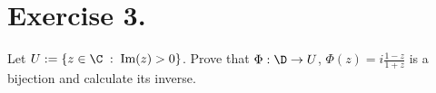 \section*{Exercise 3.}
Let $U := \{ z \in\C \;:\; \mbox{Im}(z) > 0\}$. Prove that $\Phi: \D \to U$, $\Phi(z) = i \frac{1-z}{1+z}$ is a bijection and calculate its inverse.